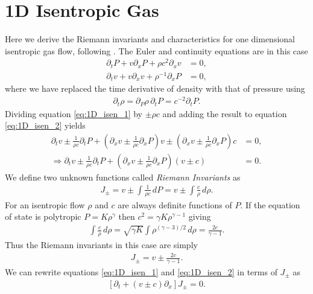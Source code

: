 \chapter{1D Isentropic Gas} \label{appendix:isentropic_riemann}

Here we derive the Riemann invariants and characteristics for one dimensional isentropic gas flow, following \citet{landau1987}.
The Euler and continuity equations are in this case
\begin{align}
    \partial_t P + v \partial_x P + \rho c^2 \partial_x v &= 0, \label{eq:1D_isen_1} \\
    \partial_t v + v \partial_x v + \rho^{-1} \partial_x P &=0, \label{eq:1D_isen_2}
\end{align}
where we have replaced the time derivative of density with that of pressure using
\begin{align}
    \partial_t \rho = \partial_P \rho \, \partial_t P = c^{-2} \partial_t P.
\end{align}
Dividing equation \ref{eq:1D_isen_1} by $\pm \rho c$ and adding the result to equation \ref{eq:1D_isen_2} yields
\begin{align}
    \partial_t v \pm \frac{1}{\rho c} \partial_t P + \left( \partial_x v \pm \frac{1}{\rho c} \partial_x P \right) v \pm \left( \partial_x v \pm \frac{1}{\rho c} \partial_x P \right) c &= 0, \\
    \Rightarrow  \partial_t v \pm \frac{1}{\rho c} \partial_t P + \left( \partial_x v \pm \frac{1}{\rho c} \partial_x P \right) \left( v \pm c \right) &= 0.
\end{align}
We define two unknown functions called \textit{Riemann Invariants} as
\begin{align}
    J_\pm = v \pm \int \frac{1}{\rho c} \, dP = v \pm \int \frac{c}{\rho} \, d\rho.
\end{align}
For an isentropic flow $\rho$ and $c$ are always definite functions of $P$.
If the equation of state is polytropic $P = K \rho^\gamma$ then $c^2 = \gamma K \rho^{\gamma-1}$ giving
\begin{align}
    \int \frac{c}{\rho} \, d\rho = \sqrt{\gamma K} \int \rho^{(\gamma-3)/2} \, d\rho = \frac{2 c}{\gamma -1}.
\end{align}
Thus the Riemann invariants in this case are simply
\begin{align}
    J_\pm = v \pm \frac{2 c}{\gamma -1}.
\end{align}
We can rewrite equations \ref{eq:1D_isen_1} and \ref{eq:1D_isen_2} in terms of $J_\pm$ as
\begin{align}
    \left[ \partial_t + \left( v \pm c \right) \partial_x \right] J_\pm = 0. \label{eq:1d_isen_riemann_eq}
\end{align}
